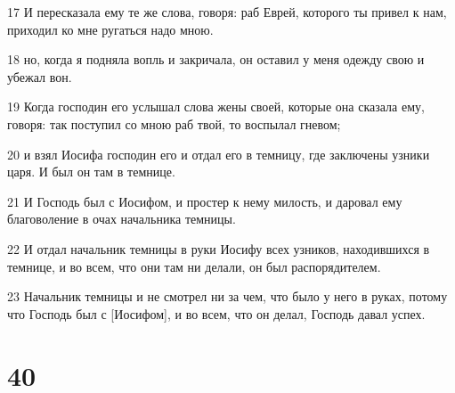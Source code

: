 \par 17 И пересказала ему те же слова, говоря: раб Еврей, которого ты привел к нам, приходил ко мне ругаться надо мною.
\par 18 но, когда я подняла вопль и закричала, он оставил у меня одежду свою и убежал вон.
\par 19 Когда господин его услышал слова жены своей, которые она сказала ему, говоря: так поступил со мною раб твой, то воспылал гневом;
\par 20 и взял Иосифа господин его и отдал его в темницу, где заключены узники царя. И был он там в темнице.
\par 21 И Господь был с Иосифом, и простер к нему милость, и даровал ему благоволение в очах начальника темницы.
\par 22 И отдал начальник темницы в руки Иосифу всех узников, находившихся в темнице, и во всем, что они там ни делали, он был распорядителем.
\par 23 Начальник темницы и не смотрел ни за чем, что было у него в руках, потому что Господь был с [Иосифом], и во всем, что он делал, Господь давал успех.

\chapter{40}

